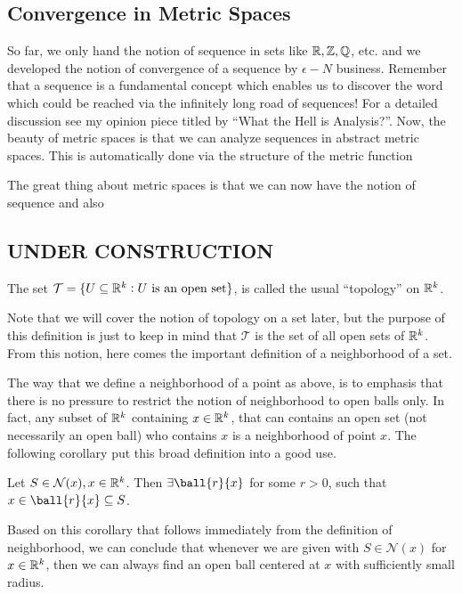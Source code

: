 \subsection{Convergence in Metric Spaces}
So far, we only hand the notion of sequence in sets like $\mathbb{R},\mathbb{Z},\mathbb{Q}$, etc. and we developed the notion of convergence of a sequence by $\epsilon-N$ business. Remember that a sequence is a fundamental concept which enables us to discover the word which could be reached via the infinitely long road of sequences! For a detailed discussion see my opinion piece titled by ``What the Hell is Analysis?''. Now, the beauty of metric spaces is that we can analyze sequences in abstract metric spaces. This is automatically done via the structure of the metric function 

The great thing about metric spaces is that we can now have the notion of sequence and also

\subsection{UNDER CONSTRUCTION}
\begin{defbox}
	The set $\mathcal{T} = \{ U \subseteq \mathbb{R}^k: U \text{ is an open set} \}$, is called the usual ``topology'' on $\mathbb{R}^k$.
\end{defbox}
Note that we will cover the notion of topology on a set later, but the purpose of this definition is just to keep in mind that $\mathcal{T}$ is the set of all open sets of $\mathbb{R}^k$. From this notion, here comes the important definition of a neighborhood of a set.


The way that we define a neighborhood of a point as above, is to emphasis that there is no pressure to restrict the notion of neighborhood to open balls only. In fact, any subset of $\mathbb{R}^k$ containing $x\in\mathbb{R}^k$, that can contains an open set (not necessarily an open ball) who contains $x$ is a neighborhood of point $x$. The following corollary put this broad definition into a good use.
\begin{corbox}
	Let $S \in \mathcal{N}(x), x\in\mathbb{R}^k$. Then $\exists \ball{r}{x}$ for some $r>0$, such that $x\in\ball{r}{x}\subseteq S$.
\end{corbox}
Based on this corollary that follows immediately from the definition of neighborhood, we can conclude that whenever we are given with $S\in\mathcal{N}(x)$ for $x\in\mathbb{R}^k$, then we can always find an open ball centered at $x$ with sufficiently small radius. 

